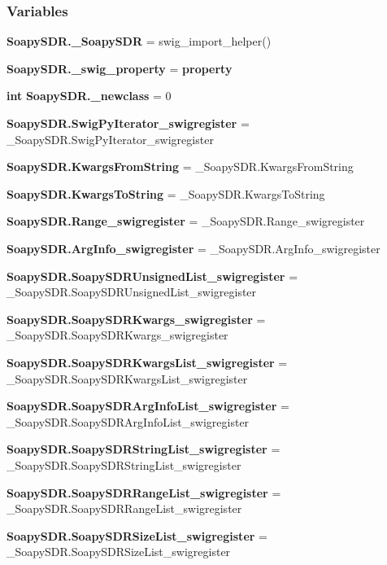 \subsubsection*{Variables}
\begin{DoxyCompactItemize}
\item 
{\bf Soapy\+S\+D\+R.\+\_\+\+Soapy\+S\+DR} = swig\+\_\+import\+\_\+helper()
\item 
{\bf Soapy\+S\+D\+R.\+\_\+swig\+\_\+property} = {\bf property}
\item 
{\bf int} {\bf Soapy\+S\+D\+R.\+\_\+newclass} = 0
\item 
{\bf Soapy\+S\+D\+R.\+Swig\+Py\+Iterator\+\_\+swigregister} = \+\_\+\+Soapy\+S\+D\+R.\+Swig\+Py\+Iterator\+\_\+swigregister
\item 
{\bf Soapy\+S\+D\+R.\+Kwargs\+From\+String} = \+\_\+\+Soapy\+S\+D\+R.\+Kwargs\+From\+String
\item 
{\bf Soapy\+S\+D\+R.\+Kwargs\+To\+String} = \+\_\+\+Soapy\+S\+D\+R.\+Kwargs\+To\+String
\item 
{\bf Soapy\+S\+D\+R.\+Range\+\_\+swigregister} = \+\_\+\+Soapy\+S\+D\+R.\+Range\+\_\+swigregister
\item 
{\bf Soapy\+S\+D\+R.\+Arg\+Info\+\_\+swigregister} = \+\_\+\+Soapy\+S\+D\+R.\+Arg\+Info\+\_\+swigregister
\item 
{\bf Soapy\+S\+D\+R.\+Soapy\+S\+D\+R\+Unsigned\+List\+\_\+swigregister} = \+\_\+\+Soapy\+S\+D\+R.\+Soapy\+S\+D\+R\+Unsigned\+List\+\_\+swigregister
\item 
{\bf Soapy\+S\+D\+R.\+Soapy\+S\+D\+R\+Kwargs\+\_\+swigregister} = \+\_\+\+Soapy\+S\+D\+R.\+Soapy\+S\+D\+R\+Kwargs\+\_\+swigregister
\item 
{\bf Soapy\+S\+D\+R.\+Soapy\+S\+D\+R\+Kwargs\+List\+\_\+swigregister} = \+\_\+\+Soapy\+S\+D\+R.\+Soapy\+S\+D\+R\+Kwargs\+List\+\_\+swigregister
\item 
{\bf Soapy\+S\+D\+R.\+Soapy\+S\+D\+R\+Arg\+Info\+List\+\_\+swigregister} = \+\_\+\+Soapy\+S\+D\+R.\+Soapy\+S\+D\+R\+Arg\+Info\+List\+\_\+swigregister
\item 
{\bf Soapy\+S\+D\+R.\+Soapy\+S\+D\+R\+String\+List\+\_\+swigregister} = \+\_\+\+Soapy\+S\+D\+R.\+Soapy\+S\+D\+R\+String\+List\+\_\+swigregister
\item 
{\bf Soapy\+S\+D\+R.\+Soapy\+S\+D\+R\+Range\+List\+\_\+swigregister} = \+\_\+\+Soapy\+S\+D\+R.\+Soapy\+S\+D\+R\+Range\+List\+\_\+swigregister
\item 
{\bf Soapy\+S\+D\+R.\+Soapy\+S\+D\+R\+Size\+List\+\_\+swigregister} = \+\_\+\+Soapy\+S\+D\+R.\+Soapy\+S\+D\+R\+Size\+List\+\_\+swigregister

\end{DoxyCompactItemize}
